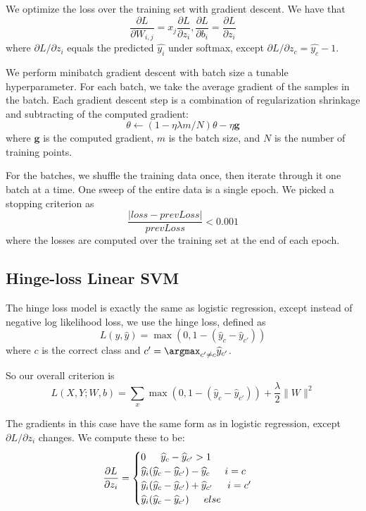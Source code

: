 \documentclass[11pt]{article}
\begin{document}
We optimize the loss over the training set with gradient descent. We have that
$$\frac{\partial L}{\partial W_{i,j}} = x_j \frac{\partial L}{\partial z_i}, \frac{\partial L}{\partial b_i} = \frac{\partial L}{\partial z_i}$$
where $\partial L / \partial z_i$ equals the predicted $\widehat{y_i}$ under softmax, except $\partial L / \partial z_c = \widehat{y_c} - 1$.

We perform minibatch gradient descent with batch size a tunable hyperparameter. For each batch, we take the average gradient of the samples in the batch. Each gradient descent step is a combination of regularization shrinkage and subtracting of the computed gradient:
$$\theta \leftarrow (1 - \eta \lambda m / N) \theta - \eta \mathbf{g}$$
where $\mathbf{g}$ is the computed gradient, $m$ is the batch size, and $N$ is the number of training points.

For the batches, we shuffle the training data once, then iterate through it one batch at a time. One sweep of the entire data is a single epoch. We picked a stopping criterion as
$$\frac{| loss - prevLoss |}{prevLoss} < 0.001$$
where the losses are computed over the training set at the end of each epoch.

\subsection{Hinge-loss Linear SVM}

The hinge loss model is exactly the same as logistic regression, except instead of negative log likelihood loss, we use the hinge loss, defined as
$$L(y, \widehat{y}) = \max(0, 1 - (\widehat{y}_c - \widehat{y}_{c'}))$$
where $c$ is the correct class and $c' = \argmax_{c' \neq c} \widehat{y}_{c'}$.

So our overall criterion is
$$L(X, Y; W, b) = \sum_x \max(0, 1 - (\widehat{y}_c - \widehat{y}_{c'})) + \frac{\lambda}{2} \lVert W \rVert ^2$$

The gradients in this case have the same form as in logistic regression, except $\partial L / \partial z_i$ changes. We compute these to be:
$$\frac{\partial L}{\partial z_i} = \begin{cases} 0 \indent \widehat{y}_c - \widehat{y}_{c'} > 1 \\
 \widehat{y}_i(\widehat{y}_c - \widehat{y}_{c'}) - \widehat{y}_c \indent i = c \\
\widehat{y}_i(\widehat{y}_c - \widehat{y}_{c'}) + \widehat{y}_{c'} \indent i = c' \\
\widehat{y}_i(\widehat{y}_c - \widehat{y}_{c'}) \indent else \end{cases}$$
\end{document}
